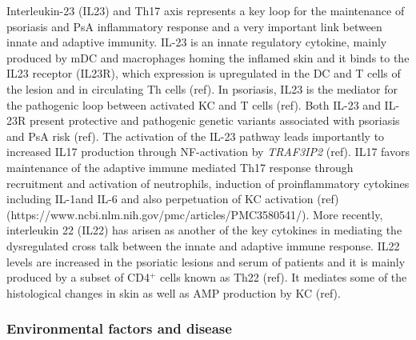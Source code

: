 Interleukin-23 (IL23) and Th17 axis represents a key loop for the maintenance of psoriasis and PsA inflammatory response and a very important link between innate and adaptive immunity. IL-23 is an innate regulatory cytokine, mainly produced by mDC and macrophages homing the inflamed skin and it binds to the IL23 receptor (IL23R), which expression is upregulated in the DC and T cells of the lesion and in circulating Th cells (ref). In psoriasis, IL23 is the mediator for the pathogenic loop between activated KC and T cells (ref). Both IL-23 and IL-23R present protective and pathogenic genetic variants associated with psoriasis and PsA risk (ref). The activation of the IL-23 pathway leads importantly to increased IL17 production through NF-\kappaB activation by \textit{TRAF3IP2} (ref). IL17 favors maintenance of the adaptive immune mediated Th17 response through recruitment and activation of neutrophils, induction of proinflammatory cytokines including IL-1\beta and IL-6 and also perpetuation of KC activation (ref) (https://www.ncbi.nlm.nih.gov/pmc/articles/PMC3580541/). %
More recently, interleukin 22 (IL22) has arisen as another of the key cytokines in mediating the dysregulated cross talk between the innate and adaptive immune response. IL22 levels are increased in the psoriatic lesions and serum of patients and it is mainly produced by a subset of CD4$^+$ cells known as Th22 (ref). It mediates some of the histological changes in skin as well as AMP production by KC (ref).


\subsubsection{Environmental factors and disease}

